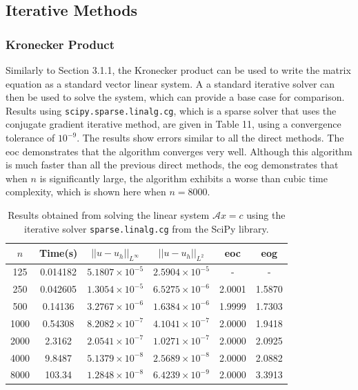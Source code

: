 \documentclass{article}
\numberwithin{equation}{section}
\begin{document}
\subsection{Iterative Methods}

\subsubsection{Kronecker Product}
Similarly to Section 3.1.1, the Kronecker product can be used to write the matrix equation as a standard vector linear system. A a standard iterative solver can then be used to solve the system, which can provide a base case for comparison. Results using \texttt{scipy.sparse.linalg.cg}, which is a sparse solver that uses the conjugate gradient iterative method, are given in Table 11, using a convergence tolerance of $10^{-9}$. The results show errors similar to all the direct methods. The eoc demonstrates that the algorithm converges very well. Although this algorithm is much faster than all the previous direct methods, the eog demonstrates that when $n$ is significantly large, the algorithm exhibits a worse than cubic time complexity, which is shown here when $n=8000$.  

\begin{table}[H]
\centering
\begin{tabular}{|c|c|c|c|c|c|}
\hline
$n$ & Time(s) & $|| u - u_h ||_{L^{\infty}}$ &$|| u - u_h ||_{L^{2}}$ & eoc & eog \\
\hline
125 & 0.014182 & $5.1807 \times 10^{-5}$ & $2.5904 \times 10^{-5}$ & - & - \\
250 & 0.042605 & $1.3054 \times 10^{-5}$ & $6.5275 \times 10^{-6}$ & 2.0001 & 1.5870 \\
500 & 0.14136 & $3.2767 \times 10^{-6}$ & $1.6384 \times 10^{-6}$ & 1.9999 & 1.7303 \\
1000 & 0.54308 & $8.2082 \times 10^{-7}$ & $4.1041 \times 10^{-7}$ & 2.0000 & 1.9418 \\
2000 & 2.3162 & $2.0541 \times 10^{-7}$ & $1.0271 \times 10^{-7}$ & 2.0000 & 2.0925 \\
4000 & 9.8487 & $5.1379 \times 10^{-8}$ & $2.5689 \times 10^{-8}$ & 2.0000 & 2.0882 \\
8000 & 103.34 & $1.2848 \times 10^{-8}$ & $6.4239 \times 10^{-9}$ & 2.0000 & 3.3913 \\
\hline
\end{tabular}
\captionsetup{justification=centering}
\caption{Results obtained from solving the linear system $\mathcal{A} x = c$ using the iterative solver  \texttt{sparse.linalg.cg} from the SciPy library.}
\end{table}
\end{document}
